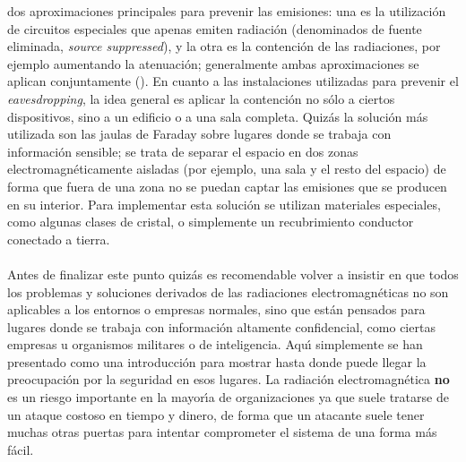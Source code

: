 dos aproximaciones principales para prevenir las emisiones: una es la 
utilizaci\'on de circuitos especiales que apenas emiten radiaci\'on (denominados
de fuente eliminada, {\it source suppressed}), y la otra es la contenci\'on de
las radiaciones, por ejemplo aumentando la atenuaci\'on; generalmente ambas
aproximaciones se aplican conjuntamente (\cite{kn:swi92}). En cuanto a las
instalaciones utilizadas para prevenir el {\it eavesdropping}, la idea general
es aplicar la contenci\'on no s\'olo a ciertos dispositivos, sino a un 
edificio o a una sala completa. Quiz\'as la soluci\'on m\'as utilizada son las 
jaulas de Faraday sobre lugares donde se trabaja con informaci\'on sensible; se
trata de separar el espacio en dos zonas electromagn\'eticamente aisladas
(por ejemplo, una sala y el resto del espacio) de forma que fuera de una zona
no se puedan captar las emisiones que se producen en su interior. Para 
implementar esta soluci\'on se utilizan materiales especiales, como algunas 
clases de cristal, o simplemente un recubrimiento conductor conectado a 
tierra.\\
\\Antes de finalizar este punto quiz\'as es recomendable volver a insistir en
que todos
los problemas y soluciones derivados de las radiaciones electromagn\'eticas no 
son aplicables a los entornos o empresas normales, sino que est\'an pensados 
para lugares donde se trabaja con informaci\'on altamente confidencial, como 
ciertas empresas u organismos militares o de inteligencia. Aqu\'{\i} simplemente
se han presentado como una introducci\'on para mostrar hasta donde puede llegar
la preocupaci\'on por la seguridad en esos lugares. La radiaci\'on 
electromagn\'etica {\bf no} es un riesgo importante en la mayor\'{\i}a de 
organizaciones ya que suele tratarse de un ataque costoso en tiempo y dinero,
de forma que un atacante suele tener muchas otras puertas para intentar 
comprometer el sistema de una forma m\'as f\'acil.
